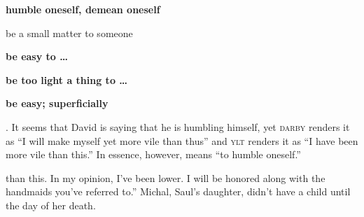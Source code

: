 \begin{inparaenum}
{\begin{inparaenum}
        \item \textbf{humble oneself, demean oneself}
        \item be a small matter to someone
        \item \textbf{be easy to \dots}
        \item \textbf{be too light a thing to \dots}
        \item \textbf{be easy; superficially}
    \end{inparaenum}%
    . It seems that David is saying that he is humbling himself, yet \textsc{darby} renders it as ``I will make myself yet more vile than thus'' and \textsc{ylt} renders it as ``I have been more vile than this.'' In essence, however,  means ``to humble oneself.''} than this. In my opinion, I've been lower. I will be honored along with the handmaids you've referred to.''%
     Michal, Saul's daughter, didn't have a child until the day of her death.%
\end{inparaenum}
